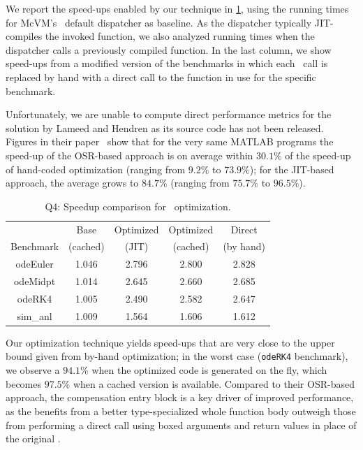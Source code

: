 {We report the speed-ups enabled by our technique in \mytable\ref{tab:CS-feval}, using the running times for McVM's \feval\ default dispatcher as baseline. As the dispatcher typically JIT-compiles the invoked function, we also analyzed running times when the dispatcher calls a previously compiled function. In the last column, we show speed-ups from a modified version of the benchmarks in which each \feval\ call is replaced by hand with a direct call to the function in use for the specific benchmark.

Unfortunately, we are unable to compute direct performance metrics for the solution by Lameed and Hendren as its source code has not been released. Figures in their paper~\cite{Lameed2013b} show that for the very same MATLAB programs the speed-up of the OSR-based approach is on average within $30.1\%$ of the speed-up of hand-coded optimization (ranging from $9.2\%$ to $73.9\%$); for the JIT-based approach, the average grows to $84.7\%$ (ranging from $75.7\%$ to $96.5\%$).

\begin{table}[ht!]
\begin{center}
\vspace{4mm}
\begin{small}
\begin{tabular}{ |c|c|c|c|c| }
\cline{2-5}
\multicolumn{1}{c|}{} & Base & Optimized & Optimized & Direct \\ 
\cline{1-1}
Benchmark & (cached) & (JIT) & (cached) & (by hand) \\
\hline
\hline
odeEuler & 1.046 & 2.796 & 2.800 & 2.828 \\ 
\hline
odeMidpt & 1.014 & 2.645 & 2.660 & 2.685 \\ 
\hline
odeRK4 & 1.005 & 2.490 & 2.582 & 2.647 \\ 
\hline
sim\_anl & 1.009 & 1.564 & 1.606 & 1.612 \\ 
\hline
\end{tabular}
\end{small}
\end{center}
\caption{\label{tab:CS-feval} Q4: Speedup comparison for \feval\ optimization.} 
\end{table}

\noindent Our optimization technique yields speed-ups that are very close to the upper bound given from by-hand optimization; in the worst case ({\tt odeRK4} benchmark), we observe a $94.1\%$ when the optimized code is generated on the fly, which becomes $97.5\%$ when a cached version is available. Compared to their OSR-based approach, the compensation entry block is a key driver of improved performance, as the benefits from a better type-specialized whole function body outweigh those from performing a direct call using boxed arguments and return values in place of the original \feval.

}
